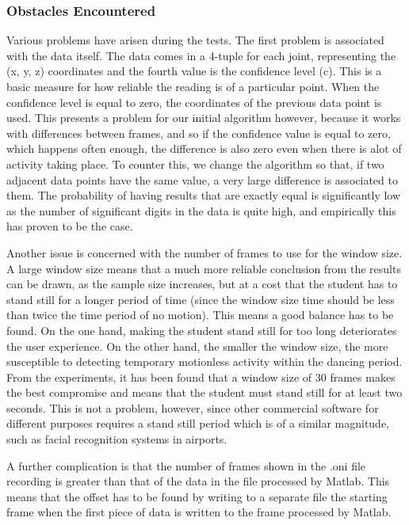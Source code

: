 \documentclass[11pt,a4paper]{article}
\begin{document}
\subsubsection{Obstacles Encountered}
\noindent
Various problems have arisen during the tests. The first problem is associated with the data itself. The data comes in a 4-tuple for each joint, representing the (x, y, z) coordinates and the fourth value is the confidence level (c). This is a basic measure for how reliable the reading is of a particular point. When the confidence level is equal to zero, the coordinates of the previous data point is used. This presents a problem for our initial algorithm however, because it works with differences between frames, and so if the confidence value is equal to zero, which happens often enough, the difference is also zero even when there is alot of activity taking place. To counter this, we change the algorithm so that, if two adjacent data points have the same value, a very large difference is associated to them. The probability of having results that are exactly equal is significantly low as the number of significant digits in the data is quite high, and empirically this has proven to be the case. 

\noindent
Another issue is concerned with the number of frames to use for the window size. A large window size means that a much more reliable conclusion from the results can be drawn, as the sample size increases, but at a cost that the student has to stand still for a longer period of time (since the window size time should be less than twice the time period of no motion). This means a good balance has to be found. On the one hand, making the student stand still for too long deteriorates the user experience. On the other hand, the smaller the window size, the more susceptible to detecting temporary motionless activity within the dancing period. From the experiments, it has been found that a window size of 30 frames makes the best compromise and means that the student must stand still for at least two seconds. This is not a problem, however, since other commercial software for different purposes requires a stand still period which is of a similar magnitude, such as facial recognition systems in airports.  

\noindent
A further complication is that the number of frames shown in the .oni file recording is greater than that of the data in the file processed by Matlab. This means that the offset has to be found by writing to a separate file the starting frame when the first piece of data is written to the frame processed by Matlab. 
\end{document}

